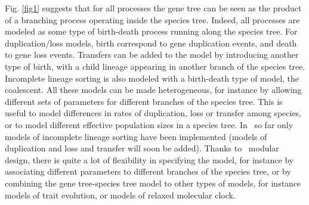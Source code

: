 Fig. \ref{fig1} suggests that for all processes the gene tree can be seen as the product of a branching process operating inside the species tree.
Indeed, all processes are modeled as some type of birth-death process running along the species tree.
For duplication/loss models, birth correspond to gene duplication events, and death to gene loss events.
Transfers can be added to the model by introducing another type of birth, with a child lineage appearing in another branch of the species tree.
Incomplete lineage sorting is also modeled with a birth-death type of model, the coalescent.
All these models can be made heterogeneous, for instance by allowing different sets of parameters for different branches of the species tree.
This is useful to model differences in rates of duplication, loss or transfer among species, or to model different effective population sizes in a species tree.
In \RevBayes~so far only models of incomplete lineage sorting have been implemented (models of duplication and loss and transfer will soon be added).
Thanks to \RevBayes~modular design, there is quite a lot of flexibility in specifying the model, for instance by associating different parameters to different branches of the species tree, or by combining the gene tree-species tree model to other types of models, for instance models of trait evolution, or models of relaxed molecular clock.


